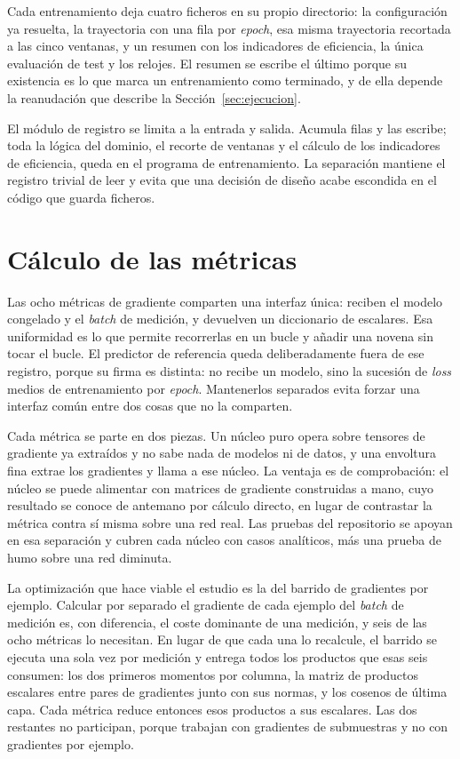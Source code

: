 Cada entrenamiento deja cuatro ficheros en su propio directorio: la configuración ya resuelta, la trayectoria con una fila por \emph{epoch}, esa misma trayectoria recortada a las cinco ventanas, y un resumen con los indicadores de eficiencia, la única evaluación de test y los relojes. El resumen se escribe el último porque su existencia es lo que marca un entrenamiento como terminado, y de ella depende la reanudación que describe la Sección~\ref{sec:ejecucion}.

El módulo de registro se limita a la entrada y salida. Acumula filas y las escribe; toda la lógica del dominio, el recorte de ventanas y el cálculo de los indicadores de eficiencia, queda en el programa de entrenamiento. La separación mantiene el registro trivial de leer y evita que una decisión de diseño acabe escondida en el código que guarda ficheros.

\section{Cálculo de las métricas}
\label{sec:impl-metricas}

Las ocho métricas de gradiente comparten una interfaz única: reciben el modelo congelado y el \emph{batch} de medición, y devuelven un diccionario de escalares. Esa uniformidad es lo que permite recorrerlas en un bucle y añadir una novena sin tocar el bucle. El predictor de referencia queda deliberadamente fuera de ese registro, porque su firma es distinta: no recibe un modelo, sino la sucesión de \emph{loss} medios de entrenamiento por \emph{epoch}. Mantenerlos separados evita forzar una interfaz común entre dos cosas que no la comparten.

Cada métrica se parte en dos piezas. Un núcleo puro opera sobre tensores de gradiente ya extraídos y no sabe nada de modelos ni de datos, y una envoltura fina extrae los gradientes y llama a ese núcleo. La ventaja es de comprobación: el núcleo se puede alimentar con matrices de gradiente construidas a mano, cuyo resultado se conoce de antemano por cálculo directo, en lugar de contrastar la métrica contra sí misma sobre una red real. Las pruebas del repositorio se apoyan en esa separación y cubren cada núcleo con casos analíticos, más una prueba de humo sobre una red diminuta.

La optimización que hace viable el estudio es la del barrido de gradientes por ejemplo. Calcular por separado el gradiente de cada ejemplo del \emph{batch} de medición es, con diferencia, el coste dominante de una medición, y seis de las ocho métricas lo necesitan. En lugar de que cada una lo recalcule, el barrido se ejecuta una sola vez por medición y entrega todos los productos que esas seis consumen: los dos primeros momentos por columna, la matriz de productos escalares entre pares de gradientes junto con sus normas, y los cosenos de última capa. Cada métrica reduce entonces esos productos a sus escalares. Las dos restantes no participan, porque trabajan con gradientes de submuestras y no con gradientes por ejemplo.

